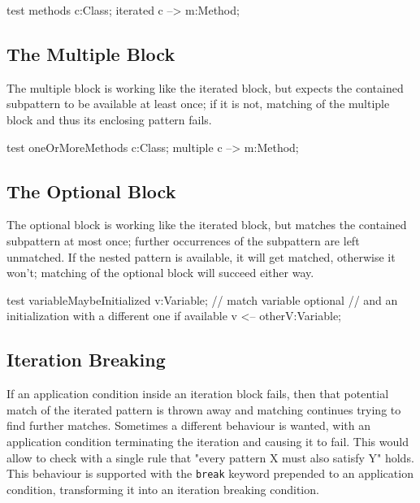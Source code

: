 \begin{example}
  \begin{grgen}
test methods
{
  c:Class;
  iterated {
    c --> m:Method;
  }  
}
  \end{grgen}
\end{example}

\subsection*{The Multiple Block}
The multiple block is working like the iterated block, but expects the contained subpattern to be available at least once; if it is not, matching of the multiple block and thus its enclosing pattern fails.

\begin{example}
  \begin{grgen}
test oneOrMoreMethods
{
  c:Class;
  multiple {
    c --> m:Method;
  }
}
  \end{grgen}
\end{example}

\subsection*{The Optional Block}
The optional block is working like the iterated block, but matches the contained subpattern at most once; further occurrences of the subpattern are left unmatched.
If the nested pattern is available, it will get matched, otherwise it won't; matching of the optional block will succeed either way.

\begin{example}
  \begin{grgen}
test variableMaybeInitialized
{
  v:Variable; // match variable
  optional { // and an initialization with a different one if available
    v <-- otherV:Variable;
  }
}
  \end{grgen}
\end{example}

\subsection*{Iteration Breaking} 
If an application condition inside an iteration block fails, then that potential match of the iterated pattern is thrown away and matching continues trying to find further matches.
Sometimes a different behaviour is wanted, with an application condition terminating the iteration and causing it to fail.
This would allow to check with a single rule that "every pattern X must also satisfy Y" holds.
This behaviour is supported with the \texttt{break} keyword prepended to an application condition, transforming it into an iteration breaking condition.


